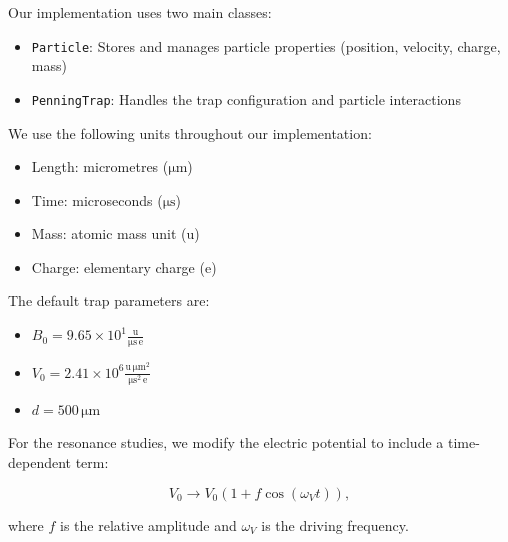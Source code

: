 \documentclass[english,notitlepage,reprint,nofootinbib]{revtex4-2}  %
\begin{document}
Our implementation uses two main classes:

\begin{itemize}
    \item \texttt{Particle}: Stores and manages particle properties (position, velocity, charge, mass)
    \item \texttt{PenningTrap}: Handles the trap configuration and particle interactions
\end{itemize}

We use the following units throughout our implementation:
\begin{itemize}
    \item Length: micrometres ($\mathrm{\mu m}$)
    \item Time: microseconds ($\mathrm{\mu s}$)
    \item Mass: atomic mass unit ($\mathrm{u}$)
    \item Charge: elementary charge ($\mathrm{e}$)
\end{itemize}

The default trap parameters are:
\begin{itemize}
    \item $B_0 = 9.65 \times 10^1 \frac{\mathrm{u}}{\mathrm{\mu s\, e}}$
    \item $V_0 = 2.41 \times 10^6 \frac{\mathrm{u\, \mu m^2}}{\mathrm{\mu s^2\, e}}$
    \item $d = 500\,\mathrm{\mu m}$
\end{itemize}

For the resonance studies, we modify the electric potential to include a time-dependent term:

\begin{equation}
    V_0 \rightarrow V_0(1 + f\cos(\omega_V t)),
\end{equation}

where $f$ is the relative amplitude and $\omega_V$ is the driving frequency.
\end{document}
